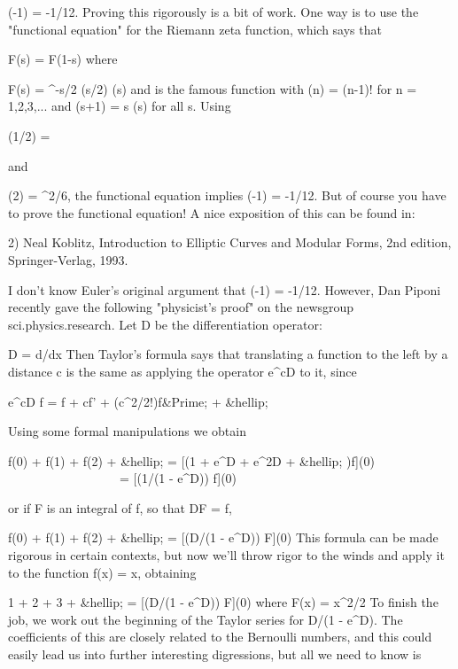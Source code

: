                           \zeta (-1) = -1/12.
Proving this rigorously is a bit of work.  One way is to use the
"functional equation" for the Riemann zeta function, which says that 

                             F(s) = F(1-s)
where 

                    F(s) = \pi ^{-s/2} \Gamma (s/2) \zeta (s)
and \Gamma  is the famous function with \Gamma (n) = (n-1)! for n = 1,2,3,...
and \Gamma (s+1) = s \Gamma (s) for all s.  Using 

                       \Gamma (1/2) = \sqrt \pi 

and

                       \zeta (2) = \pi ^{2}/6,
the functional equation implies \zeta (-1) = -1/12.  But of course you have
to prove the functional equation!  A nice exposition of this can be found 
in:

2) Neal Koblitz, Introduction to Elliptic Curves and Modular Forms, 
2nd edition, Springer-Verlag, 1993.

I don't know Euler's original argument that \zeta (-1) = -1/12.  However,
Dan Piponi recently gave the following "physicist's proof" on the
newsgroup sci.physics.research.  Let D be the differentiation operator:

                           D = d/dx
Then Taylor's formula says that translating a function to the left by
a distance c is the same as applying the operator e^{cD} to it, since

                 e^{cD} f  =  f + cf' + 
(c^{2}/2!)f&Prime; + &hellip;

Using some formal manipulations we obtain

   f(0) + f(1) + f(2) + &hellip; = [(1 + e^{D} + e^{2D} + &hellip; )f](0)
\  \  \  \  \  \  \  \ 
\  \  \  \  \  \  \  \ \  \ 
                                 = [(1/(1 - e^{D})) f](0)

or if F is an integral of f, so that DF = f, 

         f(0) + f(1) + f(2) + &hellip; = [(D/(1 - e^{D})) F](0) 
This formula can be made rigorous in certain contexts, but now we'll
throw rigor to the winds and apply it to the function f(x) = x, obtaining

              1 + 2 + 3 + &hellip; = [(D/(1 - e^{D})) F](0) 
where 
                         F(x) = x^{2}/2
To finish the job, we work out the beginning of
the Taylor series for D/(1 - e^{D}).   The coefficients of this are
closely related to the Bernoulli numbers, and this could easily lead us
into further interesting digressions, but all we need to know is

